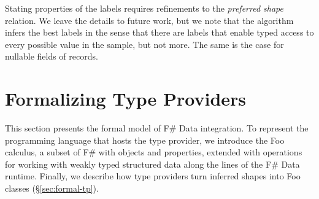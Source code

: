 \documentclass[pldi-cameraready]{sigplanconf-pldi16}
\begin{document}
Stating properties of the labels requires refinements to the \emph{preferred shape} relation.
We leave the details to future work, but we
note that the algorithm infers the best labels in the sense that there are labels that enable
typed access to every possible value in the sample, but not more. The same is the case for nullable
fields of records.


%
%

\section{Formalizing Type Providers}
\label{sec:formal}

This section presents the formal model of F\# Data integration. To represent the programming
language that hosts the type provider, we introduce the Foo calculus, a subset of F\# with objects
and properties, extended with operations for working with weakly typed structured data along the
lines of the F\# Data runtime. Finally, we describe how
type providers turn inferred shapes into Foo classes (\S\ref{sec:formal-tp}).

\end{document}
